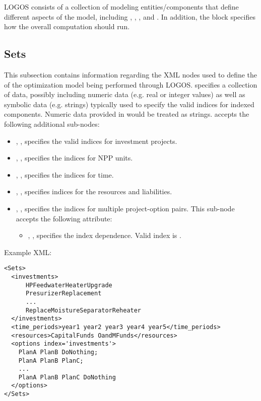 LOGOS consists of a collection of modeling entities/components that define different
aspects of the model, including , ,
, and . 
In addition, the  block specifies how the overall computation should run.

%
\subsection{Sets}
\label{subsec:Sets}

This subsection contains information regarding the XML nodes used to define the
 of the optimization model being performed through LOGOS.
 specifies a collection of data, possibly including
numeric data (e.g. real or integer values) as well as symbolic data (e.g. strings)
typically used to specify the valid indices for indexed components.
\nb Numeric data provided in  would be treated as strings.
 accepts the following additional sub-nodes:
\begin{itemize}
  \item {}, , specifies
  the valid indices for investment projects.
  \item {}, ,
  specifies the indices for NPP units.
  \item {}, ,
  specifies the indices for time.
  \item {}, ,
  specifies indices for the resources and liabilities.
  \item {}, ,
  specifies the indices for multiple project-option pairs.
  This sub-node accepts the following attribute:
  \begin{itemize}
    \item {}, , specifies the index dependence.
    Valid index is .
  \end{itemize}
\end{itemize}

Example XML:
\begin{lstlisting}[style=XML]
<Sets>
  <investments>
      HPFeedwaterHeaterUpgrade
      PresurizerReplacement
      ...
      ReplaceMoistureSeparatorReheater
  </investments>
  <time_periods>year1 year2 year3 year4 year5</time_periods>
  <resources>CapitalFunds OandMFunds</resources>
  <options index='investments'>
    PlanA PlanB DoNothing;
    PlanA PlanB PlanC;
    ...
    PlanA PlanB PlanC DoNothing
  </options>
</Sets>
\end{lstlisting}


